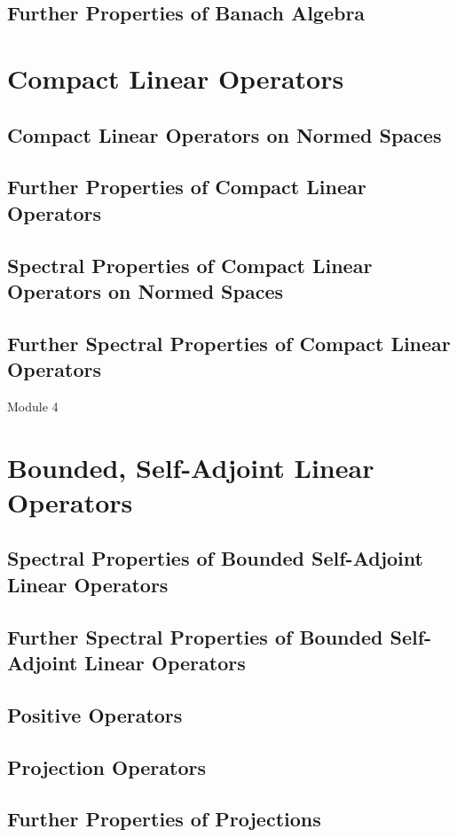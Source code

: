 \subsection{Further Properties of Banach Algebra}

\section{Compact Linear Operators}
\subsection{Compact Linear Operators on Normed Spaces}
\subsection{Further Properties of Compact Linear Operators}
\subsection{Spectral Properties of Compact Linear Operators on Normed Spaces}
\subsection{Further Spectral Properties of Compact Linear Operators}
\pagebreak

{\Large Module 4}
\section{Bounded, Self-Adjoint Linear Operators}
\subsection{Spectral Properties of Bounded Self-Adjoint Linear Operators}
\subsection{Further Spectral Properties of Bounded Self-Adjoint Linear Operators}
\subsection{Positive Operators}
\setcounter{subsection}{4}
\subsection{Projection Operators}
\subsection{Further Properties of Projections}
